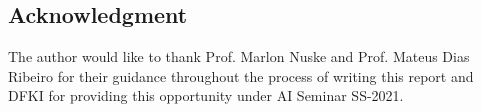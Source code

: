 \documentclass[conference,compsoc]{IEEEtran}
\begin{document}
  \subsection*{Acknowledgment}
\fi


The author would like to thank Prof. Marlon Nuske and Prof.  Mateus Dias Ribeiro for their guidance throughout the process of writing this report and DFKI for providing this opportunity under AI Seminar SS-2021.






 

\end{document}
